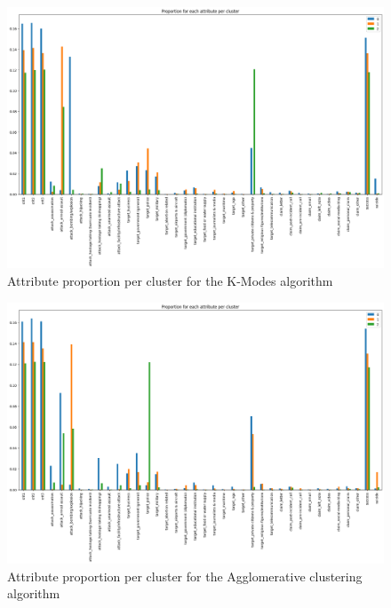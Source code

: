 \documentclass{article}
\begin{document}
\begin{figure}
    \centering
    \includegraphics[width=0.90\linewidth]{img//Clustering/kmodes cluster propotions.png}
    \caption{Attribute proportion per cluster for the K-Modes algorithm}
    \label{fig:kmodes-attributes}
\end{figure}

\begin{figure}
    \centering
    \includegraphics[width=0.90\linewidth]{img//Clustering/agglo cluster propotions.png}
    \caption{Attribute proportion per cluster for the Agglomerative clustering algorithm}
    \label{fig:agglo-attributes}
\end{figure}

\newpage
\printbibliography
\end{document}

